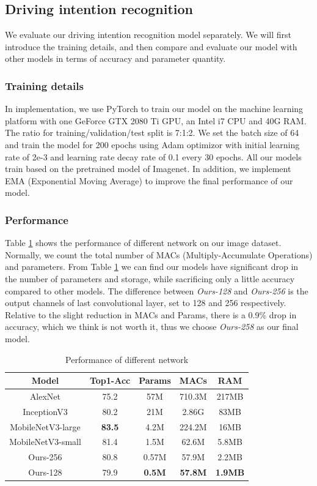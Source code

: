 \documentclass[journal]{IEEEtran}
\begin{document}
\subsection{Driving intention recognition}
We evaluate our driving intention recognition model separately. 
We will first introduce the training details, and then compare and evaluate our model with other models in terms of accuracy and parameter quantity.
\subsubsection{Training details}
In implementation, we use PyTorch to train our model on the machine learning platform with one GeForce GTX 2080 Ti GPU, an Intel i7 CPU and 40G RAM. The ratio for training/validation/test split is 7:1:2. 
We set the batch size of 64 and train the model for 200 epochs using Adam optimizor with initial learning rate of 2e-3 and learning rate decay rate of 0.1 every 30 epochs. All our models train based on the pretrained model of Imagenet.
In addition, we implement EMA (Exponential Moving Average) to improve the final performance of our model. 
\subsubsection{Performance}
Table \ref{tab:performance} shows the performance of different network on our image dataset. Normally, we count the total number of MACs (Multiply-Accumulate Operations) and parameters. From Table \ref{tab:performance} we can find our models have significant drop in the number of parameters and storage, while sacrificing only a little accuracy compared to other models. The difference between \textit{Ours-128} and \textit{Ours-256} is the output channels of last convolutional layer, set to 128 and 256 respectively. Relative to the slight reduction in MACs and Params, there is a 0.9\% drop in accuracy, which we think is not worth it, thus we choose \textit{Ours-258} as our final model.
\begin{table}[htbp]
    \centering
    \caption{Performance of different network}
      \begin{tabular}{c|c|cc|c}
      \toprule[2pt]
      Model & {Top1-Acc} & {Params} & {MACs} & {RAM} \\
      \midrule
      AlexNet & 75.2  & 57M   & 710.3M & 217MB \\
      InceptionV3 & 80.2  & 21M   & 2.86G & 83MB \\
      MobileNetV3-large & \textbf{83.5} & 4.2M  & 224.2M & 16MB \\
    MobileNetV3-small & \textcolor[rgb]{ .267,  .447,  .769}{81.4} & 1.5M  & 62.6M & 5.8MB \\
      \midrule
    Ours-256 & 80.8  & \textcolor[rgb]{ .267,  .447,  .769}{0.57M} & \textcolor[rgb]{ .267,  .447,  .769}{57.9M} & \textcolor[rgb]{ .267,  .447,  .769}{2.2MB} \\
      Ours-128 & 79.9  & \textbf{0.5M} & \textbf{57.8M} & \textbf{1.9MB} \\
      \bottomrule[2pt]
      \end{tabular}%
    \label{tab:performance}%
  \end{table}%
\end{document}
